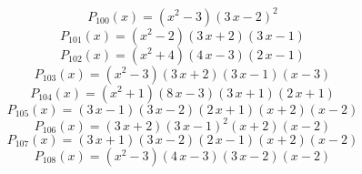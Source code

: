 \subitem \begin{dmath*}P_{100}(x) = {\left(x^{2} - 3\right)} {\left(3 \, x - 2\right)}^{2} \end{dmath*}\vspace{- 1.20000000000000 cm}
\subitem \begin{dmath*}P_{101}(x) = {\left(x^{2} - 2\right)} {\left(3 \, x + 2\right)} {\left(3 \, x - 1\right)} \end{dmath*}\vspace{- 1.20000000000000 cm}
\subitem \begin{dmath*}P_{102}(x) = {\left(x^{2} + 4\right)} {\left(4 \, x - 3\right)} {\left(2 \, x - 1\right)} \end{dmath*}\vspace{- 1.20000000000000 cm}
\subitem \begin{dmath*}P_{103}(x) = {\left(x^{2} - 3\right)} {\left(3 \, x + 2\right)} {\left(3 \, x - 1\right)} {\left(x - 3\right)} \end{dmath*}\vspace{- 1.20000000000000 cm}
\subitem \begin{dmath*}P_{104}(x) = {\left(x^{2} + 1\right)} {\left(8 \, x - 3\right)} {\left(3 \, x + 1\right)} {\left(2 \, x + 1\right)} \end{dmath*}\vspace{- 1.20000000000000 cm}
\subitem \begin{dmath*}P_{105}(x) = {\left(3 \, x - 1\right)} {\left(3 \, x - 2\right)} {\left(2 \, x + 1\right)} {\left(x + 2\right)} {\left(x - 2\right)} \end{dmath*}\vspace{- 1.20000000000000 cm}
\subitem \begin{dmath*}P_{106}(x) = {\left(3 \, x + 2\right)} {\left(3 \, x - 1\right)}^{2} {\left(x + 2\right)} {\left(x - 2\right)} \end{dmath*}\vspace{- 1.20000000000000 cm}
\subitem \begin{dmath*}P_{107}(x) = {\left(3 \, x + 1\right)} {\left(3 \, x - 2\right)} {\left(2 \, x - 1\right)} {\left(x + 2\right)} {\left(x - 2\right)} \end{dmath*}\vspace{- 1.20000000000000 cm}
\subitem \begin{dmath*}P_{108}(x) = {\left(x^{2} - 3\right)} {\left(4 \, x - 3\right)} {\left(3 \, x - 2\right)} {\left(x - 2\right)} \end{dmath*}\vspace{- 1.20000000000000 cm}
